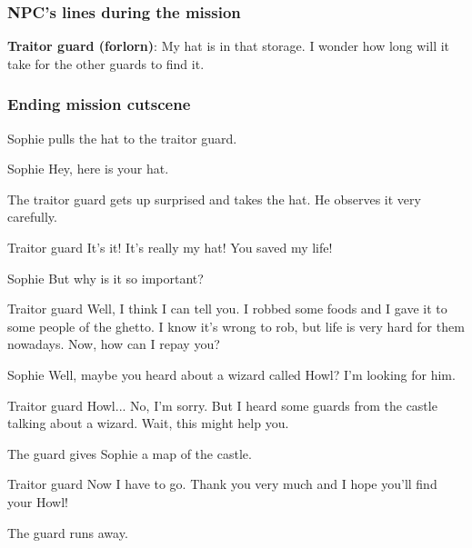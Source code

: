 \subsubsection*{NPC's lines during the mission}
\textbf{Traitor guard (forlorn)}: My hat is in that storage. I wonder how long will it take for the other guards to find it.

\subsubsection*{Ending mission cutscene}
\begin{screenplay}

Sophie pulls the hat to the traitor guard.

\begin{dialogue}{Sophie}
Hey, here is your hat.
\end{dialogue}

The traitor guard gets up surprised and takes the hat. He observes it very carefully.

\begin{dialogue}[surprised]{Traitor guard}
It's it! It's really my hat! You saved my life!
\end{dialogue}

\begin{dialogue}{Sophie}
But why is it so important?
\end{dialogue}

\begin{dialogue}[serious]{Traitor guard}
Well, I think I can tell you. I robbed some foods and I gave it to some people of the ghetto. I know it's wrong to rob, but life is very hard for them nowadays. Now, how can I repay you?
\end{dialogue}

\begin{dialogue}{Sophie}
Well, maybe you heard about a wizard called Howl? I'm looking for him.
\end{dialogue}

\begin{dialogue}[thinking]{Traitor guard}
Howl... No, I'm sorry. But I heard some guards from the castle talking about a wizard. Wait, this might help you.
\end{dialogue}

The guard gives Sophie a map of the castle.

\begin{dialogue}[continuing]{Traitor guard}
Now I have to go. Thank you very much and I hope you'll find your Howl!
\end{dialogue}

The guard runs away.

\end{screenplay}



